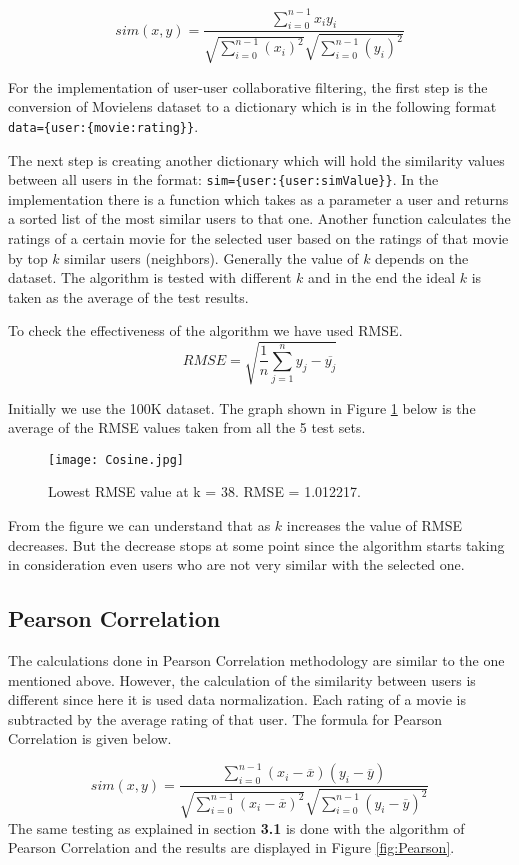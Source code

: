 \documentclass[a4paper]{article}
\begin{document}
$$sim(x,y) = \frac{\sum_{i=0}^{n-1} x_i y_i}{\sqrt{\sum_{i=0}^{n-1} (x_i)^2}{\sqrt{\sum_{i=0}^{n-1} (y_i)^2}}}$$

For the implementation of user-user collaborative filtering, the first step is the conversion of Movielens dataset to a dictionary which is in the following format
\verb|data={user:{movie:rating}}|. 

The next step is creating another dictionary which will hold the similarity values between all users in the format: \verb|sim={user:{user:simValue}}|.
In the implementation there is a function which takes as a parameter a user and returns a sorted list of the most similar users to that one. Another function calculates the ratings of a certain movie for the selected user based on the ratings of that movie by top $k$ similar users (neighbors). Generally the value of $k$ depends on the dataset. The algorithm is tested with different $k$ and in the end the ideal $k$ is taken as the average of the test results. 

To check the effectiveness of the algorithm we have used RMSE.
$$RMSE = \sqrt{\frac{1}{n} \sum_{j=1}^{n} y_j - \overline{y_j}}$$

Initially we use the 100K dataset. The graph shown in Figure \ref{fig:Cosine} below is the average of the RMSE values taken from all the 5 test sets. 

\begin{figure} [h]
\centering
\texttt{[image: Cosine.jpg]}
\caption{\label{fig:Cosine}Lowest RMSE value at k = 38. RMSE = 1.012217.}
\end{figure}
From the figure we can understand that as $k$ increases the value of RMSE decreases. But the decrease stops at some point since the algorithm starts taking in consideration even users who are not very similar with the selected one.

\subsection{Pearson Correlation}
The calculations done in Pearson Correlation methodology are similar to the one mentioned above. However, the calculation of the similarity between users is different since here it is used data normalization. Each rating of a movie is subtracted by the average rating of that user. The formula for Pearson Correlation is given below.

$$sim(x,y) = \frac{\sum_{i=0}^{n-1} (x_i - \overline{x}) (y_i - \overline{y})}{\sqrt{\sum_{i=0}^{n-1} (x_i - \overline{x})^2}{\sqrt{\sum_{i=0}^{n-1} (y_i - \overline{y})^2}}}$$
\newline
The same testing as explained in section \textbf{3.1} is done with the algorithm of Pearson Correlation and the results are displayed in Figure \ref{fig:Pearson}.
\end{document}
